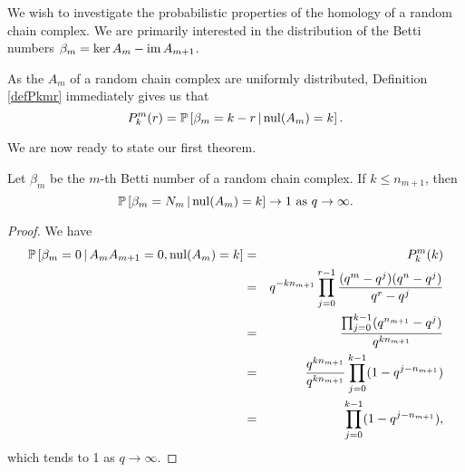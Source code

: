 We wish to investigate the probabilistic properties of the homology of a random
chain complex.  We are primarily interested in the distribution of the Betti
numbers $\beta_m = \ker A_m - \operatorname{\mathrm{im}} A_{m+1}$.


\begin{remark}
As the $A_m$ of a random chain complex are uniformly distributed, Definition
\ref{defPkmr} immediately gives us that
\[
  P^m_k(r) = \mathbb{P}\left[\beta_m = k-r \,|\, \mathrm{nul}(A_{m}) = k\right].
\]
\end{remark}



We are now ready to state our first theorem.


\begin{lemma}
  \label{lem:condqtoinfty}
Let $\beta_m$ be the $m$-th Betti number of a random chain complex.  If $k\leq n_{m+1}$, then
\[
\mathbb{P}\left[\beta_m=N_m \,|\, \mathrm{nul}(A_{m}) = k \right] \to 1 \textrm{ as } q\to\infty.
\]
\end{lemma}

\begin{proof}
We have
	\begin{eqnarray*}
	\mathbb{P}\left[\beta_m = 0 \,|\, A_{m}A_{m+1} = 0, \mathrm{nul}(A_{m}) = k \right]
    &=& P^m_k(k)\\
    &=& q^{-kn_{m+1}}\prod_{j=0}^{r-1} \frac{(q^m-q^j) (q^n - q^j)}{q^r - q^j}  \\
		&=& \frac{\prod_{j=0}^{k-1}(q^{n_{m+1}} - q^j)}
		{q^{kn_{m+1}}} \\
		&=& \frac{q^{kn_{m+1}}}{q^{kn_{m+1}}}\prod_{j=0}^{k-1}(1-q^{j-n_{m+1}})\\
		&=& \prod_{j=0}^{k-1} (1-q^{j-n_{m+1}}),
	\end{eqnarray*}
which tends to 1 as $q\to\infty$.  
\end{proof}

